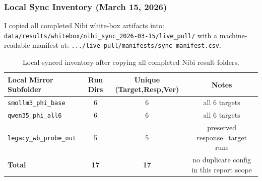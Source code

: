 \documentclass[11pt]{article}
\begin{document}
\subsubsection{Local Sync Inventory (March 15, 2026)}

I copied all completed Nibi white-box artifacts into:
\texttt{data/results/whitebox/nibi\_sync\_2026-03-15/live\_pull/}
with a machine-readable manifest at:
\texttt{.../live\_pull/manifests/sync\_manifest.csv}.

\begin{table}[H]
\centering
\small
\begin{tabular}{lccc}
\toprule
\textbf{Local Mirror Subfolder} & \textbf{Run Dirs} & \textbf{Unique (Target,Resp,Ver)} & \textbf{Notes} \\
\midrule
\texttt{smollm3\_phi\_base} & 6 & 6 & all 6 targets \\
\texttt{qwen35\_phi\_all6} & 6 & 6 & all 6 targets \\
\texttt{legacy\_wb\_probe\_out} & 5 & 5 & preserved response=target runs \\
\midrule
\textbf{Total} & \textbf{17} & \textbf{17} & no duplicate config in this report scope \\
\bottomrule
\end{tabular}
\caption{Local synced inventory after copying all completed Nibi result folders.}
\label{tab:nibi_local_sync_inventory}
\end{table}

\begin{table}[H]
\centering
\scriptsize
{}
\caption{Run-group coverage in the local mirror.}
\label{tab:nibi_local_sync_groups}
\end{table}
\end{document}

